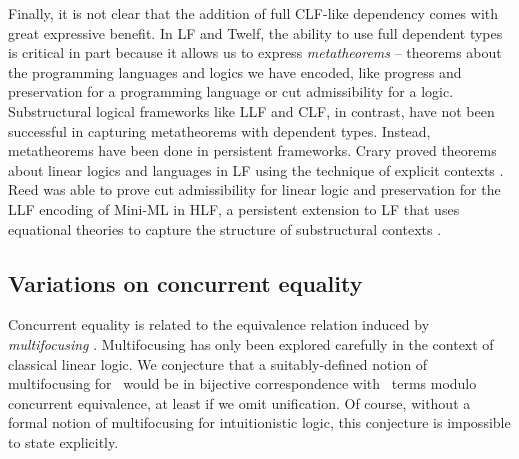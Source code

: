 Finally, it is not clear that the addition of full CLF-like dependency
comes with great expressive benefit. 
In LF and Twelf, the ability to use full dependent types is critical
in part because it allows us to express {\it metatheorems} -- theorems
about the programming languages and logics we have encoded, like
progress and preservation for a programming language or cut
admissibility for a logic. Substructural logical frameworks like LLF
and CLF, in contrast, have not been successful in capturing
metatheorems with dependent types. Instead, metatheorems have been
done in persistent frameworks. Crary proved theorems about linear
logics and languages in LF using the technique of explicit contexts
\cite{crary10higher}. Reed was able to prove cut admissibility for
linear logic and preservation for the LLF encoding of Mini-ML in HLF,
a persistent extension to LF that uses equational theories to capture
the structure of substructural contexts \cite{reed09hybrid}.




\subsection{Variations on concurrent equality}

Concurrent equality is related to the equivalence relation induced by
{\it multifocusing} \cite{chaudhuri08canonical}. Multifocusing has
only been explored carefully in the context of classical linear
logic. We conjecture that a suitably-defined notion of multifocusing
for \ollll~would be in bijective correspondence with \sls~terms modulo
concurrent equivalence, at least if we omit unification. Of course,
without a formal notion of multifocusing for intuitionistic logic, this
conjecture is impossible to state explicitly.

